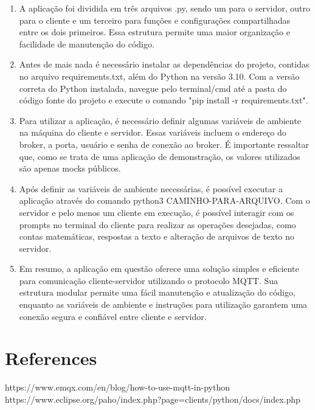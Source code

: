\documentclass[12pt]{article}
\begin{document}
\begin{enumerate}  
\item A aplicação foi dividida em três arquivos .py, sendo um para o servidor, outro para o cliente e um terceiro para funções e configurações compartilhadas entre os dois primeiros. Essa estrutura permite uma maior organização e facilidade de manutenção do código.

\item Antes de mais nada é necessário instalar as dependências do projeto, contidas no arquivo requirements.txt, além do Python na versão 3.10. Com a versão correta do Python instalada, navegue pelo terminal/cmd até a pasta do código fonte do projeto e execute o comando "pip install -r requirements.txt".

\item Para utilizar a aplicação, é necessário definir algumas variáveis de ambiente na máquina do cliente e servidor. Essas variáveis incluem o endereço do broker, a porta, usuário e senha de conexão ao broker. É importante ressaltar que, como se trata de uma aplicação de demonstração, os valores utilizados são apenas mocks públicos.

\item Após definir as variáveis de ambiente necessárias, é possível executar a aplicação através do comando python3 CAMINHO-PARA-ARQUIVO. Com o servidor e pelo menos um cliente em execução, é possível interagir com os prompts no terminal do cliente para realizar as operações desejadas, como contas matemáticas, respostas a texto e alteração de arquivos de texto no servidor.

\item Em resumo, a aplicação em questão oferece uma solução simples e eficiente para comunicação cliente-servidor utilizando o protocolo MQTT. Sua estrutura modular permite uma fácil manutenção e atualização do código, enquanto as variáveis de ambiente e instruções para utilização garantem uma conexão segura e confiável entre cliente e servidor.
\end{enumerate}

\section{References}

https://www.emqx.com/en/blog/how-to-use-mqtt-in-python
https://www.eclipse.org/paho/index.php?page=clients/python/docs/index.php
\end{document}
